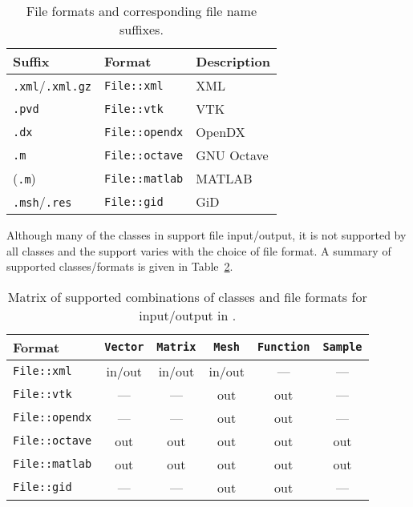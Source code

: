 \begin{table}[htbp]
  \begin{center}
    \begin{tabular}{|l|l|l|}
      \hline
      Suffix & Format & Description \\
      \hline
      \hline
      \texttt{.xml}/\texttt{.xml.gz} & \texttt{File::xml} & \dolfin{} XML \\
      \hline
      \texttt{.pvd} & \texttt{File::vtk} & VTK \\
      \hline
      \texttt{.dx} & \texttt{File::opendx} & OpenDX \\
      \hline
      \texttt{.m} & \texttt{File::octave} & GNU Octave \\
      \hline
      (\texttt{.m}) & \texttt{File::matlab} & MATLAB \\
      \hline
      \texttt{.msh}/\texttt{.res} & \texttt{File::gid} & GiD \\
      \hline
    \end{tabular}
    \caption{File formats and corresponding file name suffixes.}
    \label{tab:formats}
  \end{center}
\end{table}

Although many of the classes in \dolfin{} support file input/output,
it is not supported by all classes and the support varies with the
choice of file format. A summary of supported classes/formats is
given in Table~\ref{tab:classes,formats}.


\begin{table}[htbp]
  \begin{center}
    \begin{tabular}{|l||c|c|c|c|c|}
      \hline
      Format           & \texttt{Vector} & \texttt{Matrix} & \texttt{Mesh} & \texttt{Function} & \texttt{Sample} \\
      \hline
      \hline
      \texttt{File::xml}     & in/out & in/out & in/out & --- & --- \\
      \hline
      \texttt{File::vtk}     & ---    & ---    & out    & out & --- \\
      \hline
      \texttt{File::opendx}  & ---    & ---    & out    & out & --- \\
      \hline
      \texttt{File::octave}  & out    & out    & out    & out & out \\
      \hline
      \texttt{File::matlab}  & out    & out    & out    & out & out \\
      \hline
      \texttt{File::gid}     & ---    & ---    & out    & out & ---\\
      \hline
    \end{tabular}
    \caption{Matrix of supported combinations of classes and file
      formats for input/output in \dolfin{}.}
    \label{tab:classes,formats}
  \end{center}
\end{table}

